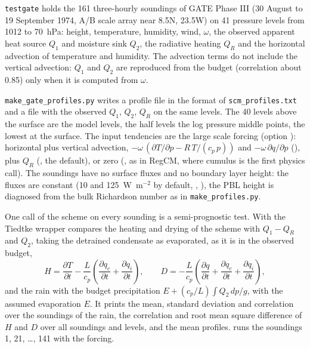 \verb=testgate= holds the 161 three-hourly soundings of GATE Phase III
(30 August to 19 September 1974, A/B scale array near 8.5\textdegree N,
23.5\textdegree W) on 41 pressure levels from 1012 to 70~hPa: height,
temperature, humidity, wind, $\omega$, the observed apparent heat source
$Q_1$ and moisture sink $Q_2$, the radiative heating $Q_R$ and the
horizontal advection of temperature and humidity. The advection terms
do not include the vertical advection: $Q_1$ and $Q_2$ are reproduced
from the budget (correlation about 0.85) only when it is computed from
$\omega$.

\verb=make_gate_profiles.py= writes a profile file in the format of
\verb=scm_profiles.txt= and a file with the observed $Q_1$, $Q_2$, $Q_R$
on the same levels. The 40 levels above the surface are the model levels,
the half levels the log pressure middle points, the lowest at the surface.
The input tendencies are the large scale forcing (option
): horizontal plus vertical advection,
$-\omega\,(\partial T/\partial p - R\,T/(c_p\,p))$ and
$-\omega\,\partial q/\partial p$ (), plus $Q_R$
(, the default), or zero (, as in RegCM, where
cumulus is the first physics call). The soundings have no surface fluxes
and no boundary layer height: the fluxes are constant (10 and
125~W~m$^{-2}$ by default, , ), the PBL height is
diagnosed from the bulk Richardson number as in \verb=make_profiles.py=.

One call of the scheme on every sounding is a semi-prognostic test. With
 the Tiedtke wrapper compares the heating and drying of the
scheme with $Q_1-Q_R$ and $Q_2$, taking the detrained condensate as
evaporated, as it is in the observed budget,
\begin{equation}
  H = \frac{\partial T}{\partial t} - \frac{L}{c_p}
      \left(\frac{\partial q_c}{\partial t} +
      \frac{\partial q_i}{\partial t}\right), \qquad
  D = -\frac{L}{c_p}\left(\frac{\partial q}{\partial t} +
      \frac{\partial q_c}{\partial t} +
      \frac{\partial q_i}{\partial t}\right),
\end{equation}
and the rain with the budget precipitation
$E + (c_p/L)\int Q_2\,dp/g$, with the assumed evaporation $E$. It
prints the mean, standard deviation and correlation over the soundings of
the rain, the correlation and root mean square difference of $H$ and $D$
over all soundings and levels, and the mean profiles. 
runs the soundings 1, 21, \ldots, 141 with the  forcing.

